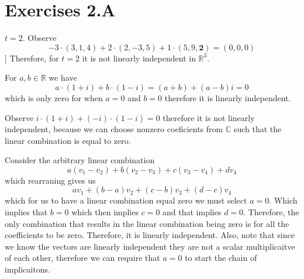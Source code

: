 \documentclass[10pt, twocolumn]{article}
\newcommand{\C}{\mathbb{C}}
\newcommand{\R}{\mathbb{R}}
\begin{document}
\section*{Exercises 2.A}
\begin{q}[Problem 3]
    $ t = 2 $. 
    Observe
    $$ -3 \cdot (3, 1, 4) + 2 \cdot (2, -3, 5) + 1 \cdot (5, 9, \textbf{2}) = (0, 0 , 0) $$]
    Therefore, for $ t = 2$ it is not linearly independent in $ \R ^3 $.
\end{q}
\begin{q}[Problem 5(a)]
    For $ a, b \in \R $ we have 
    $$ a \cdot ( 1+ i) + b \cdot (1 - i) = (a + b) + (a-b) i = 0 $$
    which is only zero for when $ a = 0 $ and $ b = 0 $ therefore it is linearly independent.
\end{q}
\begin{q}[Problem 5(b)]
    Observe
    $ i \cdot (1 + i)  + (-i) \cdot (1 -i) = 0 $
    therefore it is not linearly independent, 
    because we can choose nonzero coeficients from $ \C $ such that the linear combination is equal to zero.
\end{q}
\begin{q}[Problem 6]
    Consider the arbitrary linear combination 
    $$ a(v_1 - v_2) + b(v_2 - v_3) + c(v_3 - v_4) + d v_4 $$
    which rearraning gives us 
    $$ av_1 + (b-a)v_2 + (c-b)v_3 + (d-c) v_4 $$
    which for us to have a linear combination equal zero we must select $ a = 0$. 
    Which implies that $ b = 0$ which then implies $ c = 0 $ and that implies $ d = 0 $. 
    Therefore, the only combination that results in the linear combination being zero is for all the coefficients to be zero.
    Therefore, it is linearly independent. 
    Also, note that since we know the vectors are linearly independent they are not a scalar multiplicaitve of each other, therefore we can require that $ a = 0 $ to start the chain of implicaitons. 
\end{q}
\end{document}
